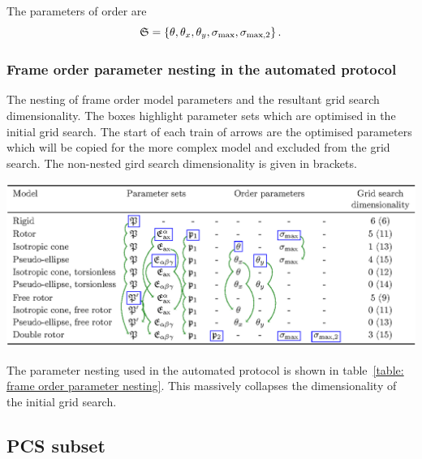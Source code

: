 The parameters of order are
\begin{equation}
    \mathfrak{S} = \left\{ \theta, \theta_x, \theta_y, \sigma_\textrm{max}, \sigma_{\textrm{max,2}} \right\}.
\end{equation}


\subsubsection{Frame order parameter nesting in the automated protocol}

\begin{table}
\begin{center}
\caption[Frame order parameter nesting.]{The nesting of frame order model parameters and the resultant grid search dimensionality.  The boxes highlight parameter sets which are optimised in the initial grid search.  The start of each train of arrows are the optimised parameters which will be copied for the more complex model and excluded from the grid search.  The non-nested gird search dimensionality is given in brackets.}
\includegraphics[width=\textwidth]{frame_order/parameter_nesting.ps}
\label{table: frame order parameter nesting}
\end{center}
\end{table}

The parameter nesting used in the automated protocol is shown in table~\ref{table: frame order parameter nesting}.
This massively collapses the dimensionality of the initial grid search.





\subsection{PCS subset}

